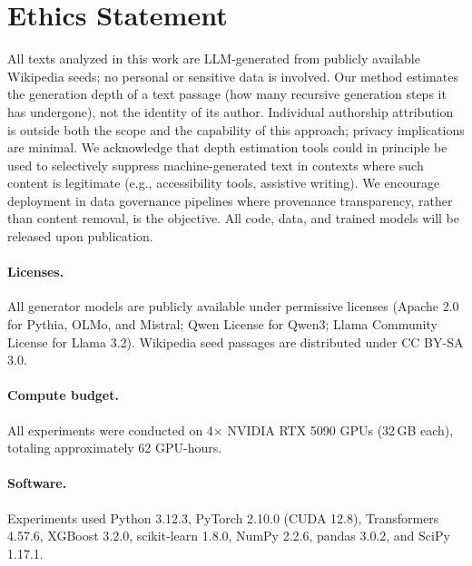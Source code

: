 \section*{Ethics Statement}
\label{sec:ethics}

All texts analyzed in this work are LLM-generated from publicly available Wikipedia seeds; no personal or sensitive data is involved.
Our method estimates the generation depth of a text passage (how many recursive generation steps it has undergone), not the identity of its author.
Individual authorship attribution is outside both the scope and the capability of this approach; privacy implications are minimal.
We acknowledge that depth estimation tools could in principle be used to selectively suppress machine-generated text in contexts where such content is legitimate (e.g., accessibility tools, assistive writing).
We encourage deployment in data governance pipelines where provenance transparency, rather than content removal, is the objective.
All code, data, and trained models will be released upon publication.

\paragraph{Licenses.}
All generator models are publicly available under permissive licenses (Apache 2.0 for Pythia, OLMo, and Mistral; Qwen License for Qwen3; Llama Community License for Llama 3.2).
Wikipedia seed passages are distributed under CC BY-SA 3.0.

\paragraph{Compute budget.}
All experiments were conducted on 4$\times$ NVIDIA RTX 5090 GPUs (32\,GB each), totaling approximately 62 GPU-hours.

\paragraph{Software.}
Experiments used Python 3.12.3, PyTorch 2.10.0 (CUDA 12.8), Transformers 4.57.6, XGBoost 3.2.0, scikit-learn 1.8.0, NumPy 2.2.6, pandas 3.0.2, and SciPy 1.17.1.
